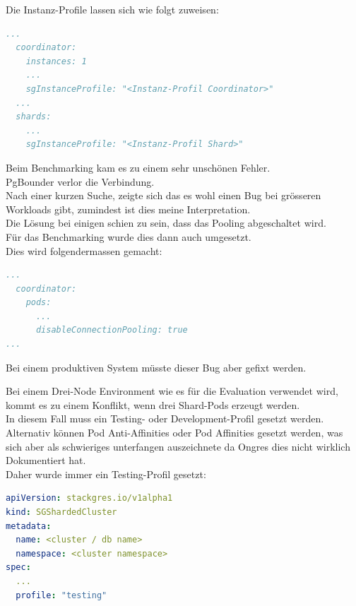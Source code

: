 \begin{flushleft}
    Die Instanz-Profile lassen sich wie folgt zuweisen:
\lstset{style=gra_codestyle}
\begin{lstlisting}[language=yaml, caption=StackGres-Citus - Instanz-Profile, captionpos=b,label={lst:stackgres-citus-sginstanceprofile},breaklines=true]
  ...
  coordinator:
    instances: 1
    ...
    sgInstanceProfile: "<Instanz-Profil Coordinator>"
  ...
  shards:
    ...
    sgInstanceProfile: "<Instanz-Profil Shard>"
\end{lstlisting}
\end{flushleft}
\begin{flushleft}
    Beim Benchmarking kam es zu einem sehr unschönen Fehler.\\
    PgBounder verlor die Verbindung.\\
    Nach einer kurzen Suche, zeigte sich das es wohl einen Bug bei grösseren Workloads gibt, zumindest ist dies meine Interpretation.\\
    Die Lösung bei einigen schien zu sein, dass das Pooling abgeschaltet wird\cite{JU2PRK9L}.\\
    Für das Benchmarking wurde dies dann auch umgesetzt.\\
    Dies wird folgendermassen gemacht:
\lstset{style=gra_codestyle}
\begin{lstlisting}[language=yaml, caption=StackGres-Citus - StorageClass -PVC Binding,captionpos=b,label={lst:stackgres-citus-disable-pooler},breaklines=true]
...
  coordinator:
    pods:
      ...
      disableConnectionPooling: true
...
\end{lstlisting}
    Bei einem produktiven System müsste dieser Bug aber gefixt werden.
\end{flushleft}
\begin{flushleft}
    Bei einem Drei-Node Environment wie es für die Evaluation verwendet wird,\\kommt es zu einem Konflikt, wenn drei Shard-Pods erzeugt werden.\\
    In diesem Fall muss ein Testing- oder Development-Profil gesetzt werden.\\
    Alternativ können Pod Anti-Affinities oder Pod Affinities gesetzt werden, was sich aber als schwieriges unterfangen auszeichnete da Ongres dies nicht wirklich Dokumentiert hat.\\
    Daher wurde immer ein Testing-Profil gesetzt:
\lstset{style=gra_codestyle}
\begin{lstlisting}[language=yaml, caption=StackGres-Citus - Cluster Profil,captionpos=b,label={lst:stackgres-citus-cluster-profile},breaklines=true]
apiVersion: stackgres.io/v1alpha1
kind: SGShardedCluster
metadata:
  name: <cluster / db name>
  namespace: <cluster namespace>
spec:
  ...
  profile: "testing"
\end{lstlisting}
\end{flushleft}
